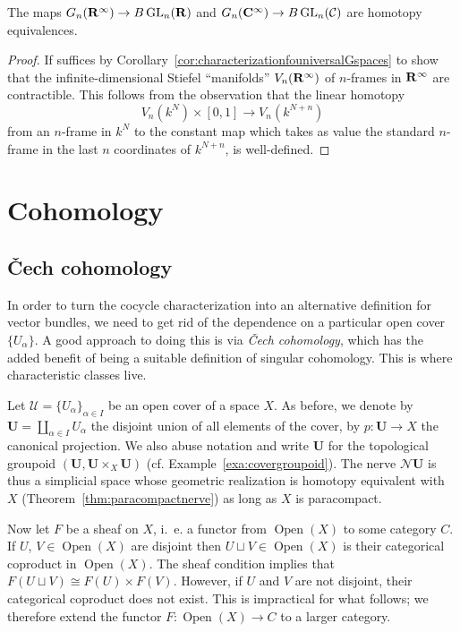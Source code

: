 \documentclass[a4paper,openany]{scrbook}
\DeclareMathOperator{\Open}{Open}
\renewcommand{\C}{\mathcal C}
\newcommand{\nerve}{\mathcal N}
\begin{document}
\begin{corollary}
The maps $G_n(\mathbf R^\infty) \to B\operatorname{GL}_n(\mathbf R)$ and $G_n(\CC^\infty) \to B\GL_n(\C)$ are homotopy equivalences.
\end{corollary}
\begin{proof}
If suffices by Corollary~\ref{cor:characterizationfouniversalGspaces} to show that the infinite-dimensional Stiefel ``manifolds'' $V_n(\mathbf R^\infty)$ of $n$-frames in $\mathbf R^\infty$ are contractible. This follows from the observation that the linear homotopy
\[
V_n(k^N)\times [0,1] \to V_n(k^{N+n})
\]
from an $n$-frame in $k^N$ to the constant map which takes as value the standard $n$-frame in the last $n$ coordinates of $k^{N+n}$, is well-defined. 
\end{proof}

\chapter{Cohomology} \label{ch:cohomology}

\section{Čech cohomology}

In order to turn the cocycle characterization into an alternative definition for vector bundles, we need to get rid of the dependence on a particular open cover $\{U_\alpha\}$. A good approach to doing this is via \emph{Čech cohomology}, which has the added benefit of being a suitable definition of singular cohomology. This is where characteristic classes live.

Let $\mathcal U = \{U_\alpha\}_{\alpha \in I}$ be an open cover of a space $X$. As before, we denote by $\mathbf U = \coprod_{\alpha \in I} U_{\alpha}$ the disjoint union of all elements of the cover, by $p\colon \mathbf U \to X$ the canonical projection. We also abuse notation and write $\mathbf U$ for the topological groupoid $(\mathbf U, \mathbf U \times_X \mathbf U)$ (cf. Example~\ref{exa:covergroupoid}). The nerve $\nerve\mathbf U$ is thus a simplicial space whose geometric realization is homotopy equivalent with $X$ (Theorem~\ref{thm:paracompactnerve}) as long as $X$ is paracompact.

Now let $F$ be a sheaf on $X$, i.~e. a functor from $\Open(X)$ to some category $C$. If $U$, $V \in \Open(X)$ are disjoint then $U \sqcup V \in \Open(X)$ is their categorical coproduct in $\Open(X)$. The sheaf condition implies that $F(U \sqcup V) \cong F(U) \times F(V)$. However, if $U$ and $V$ are not disjoint, their categorical coproduct does not exist. This is impractical for what follows; we therefore extend the functor $F\colon \Open(X) \to C$ to a larger category.
\end{document}
